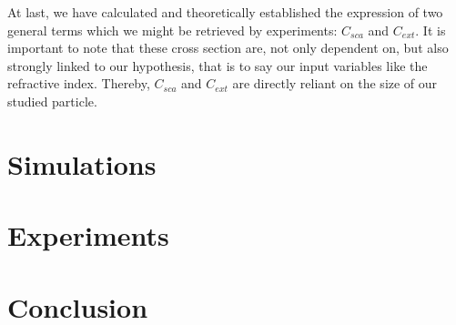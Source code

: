 \documentclass{article}
\numberwithin{equation}{section}
\begin{document}
At last, we have calculated and theoretically established the expression of two general terms which we might be retrieved by experiments: $C_{sca}$ and $C_{ext}$. It is important to note that these cross section are, not only dependent on, but also strongly linked to our hypothesis, that is to say our input variables like the refractive index. Thereby, $C_{sca}$ and $C_{ext}$ are directly reliant on the size of our studied particle.

\section{Simulations}

\section{Experiments}

\section{Conclusion}
\end{document}

